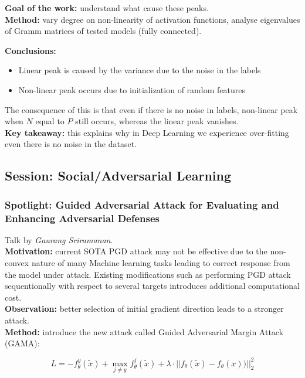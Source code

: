 {\bf Goal of the work:} understand what cause these peaks. \\

{\bf Method:} vary degree on non-linearity of activation functions, analyse eigenvalues of Gramm matrices of tested models (fully connected).

{\bf Conclusions:} 
\begin{itemize}
  \item Linear peak is caused by the variance due to the noise in the labels
  \item Non-linear peak occurs due to initialization of random features
\end{itemize}
The consequence of this is that even if there is no noise in labels, non-linear peak when $N$ equal to $P$ still occurs, whereas the linear peak vanishes. \\

{\bf Key takeaway:} this explains why in Deep Learning we experience over-fitting even there is no noise in the dataset. \\



\subsection{Session: Social/Adversarial Learning}
\subsubsection{Spotlight: Guided Adversarial Attack for Evaluating and Enhancing Adversarial Defenses \cite{SriramananABR20}}

Talk by \textit{Gaurang Sriramanan}. \\

{\bf Motivation:} current SOTA PGD attack may not be effective due to the non-convex nature of many Machine learning tasks leading to correct response from the model under attack. Existing modifications such as performing PGD attack sequentionally with respect to several targets introduces additional computational cost. \\

{\bf Observation:} better selection of initial gradient direction leads to a stronger attack. \\

{\bf Method:} introduce the new attack called Guided Adversarial Margin Attack (GAMA):

\begin{equation}
    L = -f^{y}_{\theta}(\tilde{x}) + \max_{j \neq y} f^{j}_{\theta}(\tilde{x}) + \lambda \cdot ||f_{\theta}(\tilde{x}) - f_{\theta}(x))||^2_2 
    \label{eq:gama}
\end{equation}

